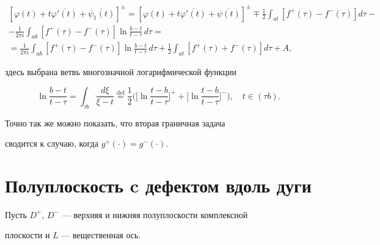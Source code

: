 \begin{multline*}


[\varphi(t)+t\overline{\varphi'(t)}+\overline{\psi_1(t)}]^{\pm} =


[\varphi(t)+t\overline{\varphi'(t)}+\overline{\psi(t)}]^{\pm}


\mp\frac{1}{2}\int_{at}[f^+(\tau)-f^-(\tau)]d\tau - \\


%


- \frac{1}{2\pi i}\int_{ab}


[f^+(\tau)-f^-(\tau)]\ln\frac{b-t}{t-\tau}\,d\tau = \\


%


= \frac{1}{2\pi i}\int_{ab}


[f^+(\tau)-f^-(\tau)]\ln\frac{b-t}{t-\tau}\,d\tau


+ \frac{1}{2}\int_{at}[f^+(\tau)+f^-(\tau)]d\tau + A,


\end{multline*}


здесь выбрана ветвь многозначной логарифмической функции


$$


\ln\frac{b-t}{t-\tau} =\int_{\tau b}\frac{d\xi}{\xi-t}


\overset{\text{def}}{=} \frac{1}{2} \bigg(


\bigg[ \ln\frac{t-b}{t-\tau} \bigg]^+


+ \bigg[ \ln\frac{t-b}{t-\tau} \bigg]^- \bigg),\quad t\in (\tau b).


$$


Точно так же можно показать, что вторая граничная задача


сводится к случаю, когда $g^+(\cdot)=g^-(\cdot)$.





\section{Полуплоскость c дефектом вдоль дуги}





Пусть $D^+$, $D^-$ --- верхняя и нижняя полуплоскости комплексной


плоскости и $L$ --- вещественная ось.





